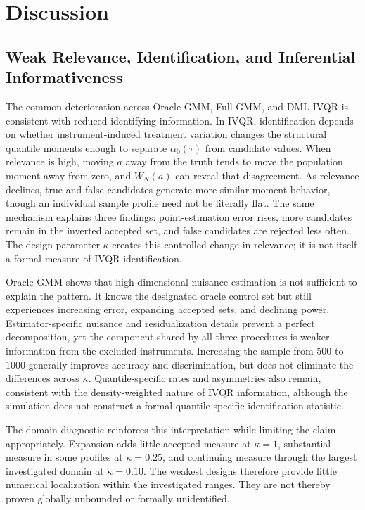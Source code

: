 \section{Discussion}

\subsection{Weak Relevance, Identification, and Inferential Informativeness}

The common deterioration across Oracle-GMM, Full-GMM, and DML-IVQR is consistent with reduced identifying information. In IVQR, identification depends on whether instrument-induced treatment variation changes the structural quantile moments enough to separate $\alpha_0(\tau)$ from candidate values. When relevance is high, moving $a$ away from the truth tends to move the population moment away from zero, and $W_N(a)$ can reveal that disagreement. As relevance declines, true and false candidates generate more similar moment behavior, though an individual sample profile need not be literally flat. The same mechanism explains three findings: point-estimation error rises, more candidates remain in the inverted accepted set, and false candidates are rejected less often. The design parameter $\kappa$ creates this controlled change in relevance; it is not itself a formal measure of IVQR identification.

Oracle-GMM shows that high-dimensional nuisance estimation is not sufficient to explain the pattern. It knows the designated oracle control set but still experiences increasing error, expanding accepted sets, and declining power. Estimator-specific nuisance and residualization details prevent a perfect decomposition, yet the component shared by all three procedures is weaker information from the excluded instruments. Increasing the sample from $500$ to $1000$ generally improves accuracy and discrimination, but does not eliminate the differences across $\kappa$. Quantile-specific rates and asymmetries also remain, consistent with the density-weighted nature of IVQR information, although the simulation does not construct a formal quantile-specific identification statistic.

The domain diagnostic reinforces this interpretation while limiting the claim appropriately. Expansion adds little accepted measure at $\kappa=1$, substantial measure in some profiles at $\kappa=0.25$, and continuing measure through the largest investigated domain at $\kappa=0.10$. The weakest designs therefore provide little numerical localization within the investigated ranges. They are not thereby proven globally unbounded or formally unidentified.

